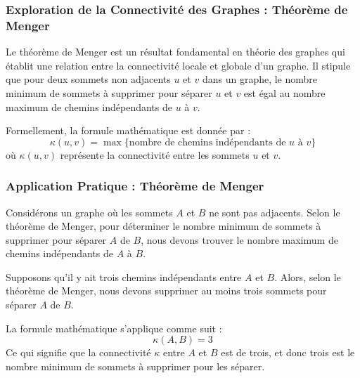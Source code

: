 \begin{frame}
\frametitle{Exploration de la Connectivité des Graphes : Théorème de Menger}
\begin{tcolorbox}[colback=orange!10,colframe=orange!100!black,
    title=\textbf{Théorème de Menger}]
    Le théorème de Menger est un résultat fondamental en théorie des graphes qui établit une relation entre la connectivité locale et globale d'un graphe. Il stipule que pour deux sommets non adjacents \( u \) et \( v \) dans un graphe, le nombre minimum de sommets à supprimer pour séparer \( u \) et \( v \) est égal au nombre maximum de chemins indépendants de \( u \) à \( v \).
    
    Formellement, la formule mathématique est donnée par :
    $$ \kappa(u,v) = \max \{ \text{nombre de chemins indépendants de } u \text{ à } v \} $$
    où \( \kappa(u,v) \) représente la connectivité entre les sommets \( u \) et \( v \).
\end{tcolorbox}
\end{frame}

\begin{frame}
\frametitle{Application Pratique : Théorème de Menger}
\begin{tcolorbox}[colback=orange!10,colframe=orange!100!black,
    title=\textbf{Exemple du Théorème de Menger}]
    Considérons un graphe où les sommets \( A \) et \( B \) ne sont pas adjacents. Selon le théorème de Menger, pour déterminer le nombre minimum de sommets à supprimer pour séparer \( A \) de \( B \), nous devons trouver le nombre maximum de chemins indépendants de \( A \) à \( B \).

    Supposons qu'il y ait trois chemins indépendants entre \( A \) et \( B \). Alors, selon le théorème de Menger, nous devons supprimer au moins trois sommets pour séparer \( A \) de \( B \).

    La formule mathématique s'applique comme suit :
    $$ \kappa(A,B) = 3 $$
    Ce qui signifie que la connectivité \( \kappa \) entre \( A \) et \( B \) est de trois, et donc trois est le nombre minimum de sommets à supprimer pour les séparer.
\end{tcolorbox}
\end{frame}




